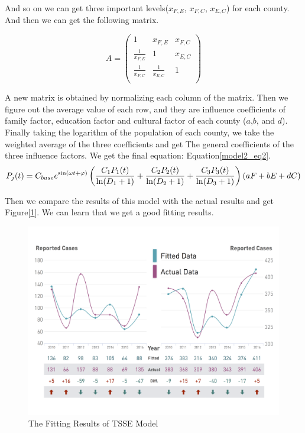 \documentclass{mcmthesis}
\begin{document}
And so on we can get three important levels($x_{F,E}$, $x_{F,C}$, $x_{E,C}$) for each county. And then we can get the following matrix.

\[A=
\begin{pmatrix}
{1 } & {x_{F,E} } & {x_{F,C} }  \\
{\frac{1}{x_{F,E}}} & {1 } & {x_{E,C} }  \\
{\frac{1}{x_{F,C} } } & {\frac{1}{x_{E,C}} } & {1}  \\
\end{pmatrix}
\]

A new matrix is obtained by normalizing each column of the matrix. Then we figure out the average value of each row, and they are influence coefficients of family factor, education factor and cultural factor of each county ($a$,$b$, and $d$). Finally taking the logarithm of the population of each county, we take the weighted average of the three coefficients and get The general coefficients of the three influence factors. We get the final equation: Equation\eqref{model2_eq2}.
\begin{equation}
P_{j}(t) = C_{base} e^{\sin (\omega t+\varphi)} \left(\frac{C_1 P_1(t)}{\ln (D_1+1)}+\frac{C_2 P_2(t)}{\ln (D_2+1)}+\frac{C_3 P_3(t)}{\ln (D_3+1)}\right)\left(a\*F+b\*E+d\*C\right)
\label{model2_eq2}
\end{equation}

Then we compare the results of this model with the actual results and get Figure[\ref{model2_results}]. We can learn that we get a good fitting results.

\begin{figure}[h]
	\centering
	\includegraphics[width=15cm]{figure-release/Model2.FittingResult.png}
	\caption{The Fitting Results of TSSE Model}\label{model2_results}
\end{figure}
\end{document}
